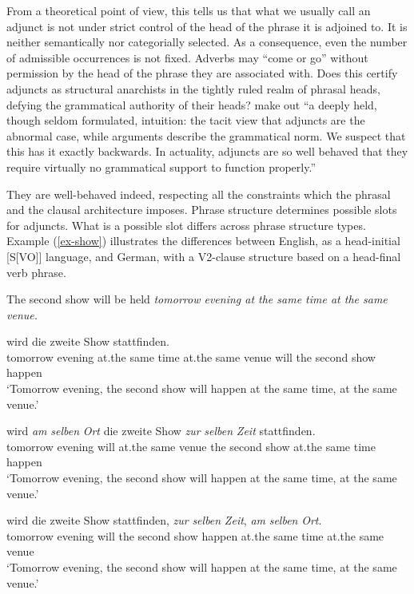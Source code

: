 \documentclass[output=paper
  ,nobabel
  ,uniformtopskip %
]{langscibook}
\begin{document}
From a theoretical point of view, this tells us that what we usually call an adjunct is not under strict control of the head of the phrase it is adjoined to. It is neither semantically nor categorially selected. As a consequence, even the number of admissible occurrences is not fixed. Adverbs may ``come or go'' without permission by the head of the phrase they are associated with. Does this certify adjuncts as structural anarchists in the tightly ruled realm of phrasal heads, defying the grammatical authority of their heads? \citet*[58]{HornsteinNunes2008} make out ``a deeply held, though seldom formulated, intuition: the tacit view that adjuncts are the abnormal case, while arguments describe the grammatical norm. We suspect that this has it exactly backwards. In actuality, adjuncts are so well behaved that they require virtually no grammatical support to function properly.''

They are well-behaved indeed, respecting all the constraints which the phrasal and the clausal architecture imposes. Phrase structure determines possible slots for adjuncts. What is a possible slot differs across phrase structure types. Example (\ref{ex-show}) illustrates the differences between English, as a head-initial [S[VO]] language, and German, with a V2-clause structure based on a head-final verb phrase.

\eal\label{ex-show}
\ex\label{ex-tomorrow}
The second show will be held \emph{tomorrow evening at the same time at the same venue.}

\ex\label{ex-morgen}
 wird die zweite Show stattfinden. \\
\spacebr{}tomorrow evening at.the same time at.the same venue will the second show happen\\
\glt `Tomorrow evening, the second show will happen at the same time, at the same venue.'

\ex\label{ex-morgenabend}
 wird \emph{am} \emph{selben} \emph{Ort} die zweite Show \emph{zur} \emph{selben} \emph{Zeit} stattfinden. \\
\spacebr{}tomorrow evening will at.the same venue the second show at.the same time happen\\
\glt `Tomorrow evening, the second show will happen at the same time, at the same venue.'

\ex\label{ex-zweiteshow}
 wird die zweite Show stattfinden, \emph{zur} \emph{selben} \emph{Zeit}, \emph{am} \emph{selben} \emph{Ort}. \\
\spacebr{}tomorrow evening will the second show happen at.the same time at.the same venue \\
\glt `Tomorrow evening, the second show will happen at the same time, at the same venue.'
\zl
\end{document}
